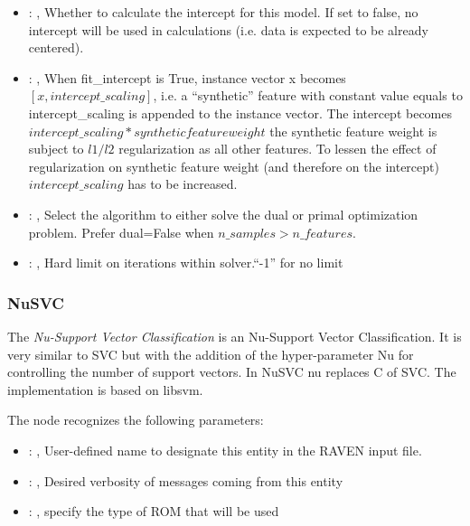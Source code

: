 \begin{itemize}
    \item {}: , 
      Whether to calculate the intercept for this model. If set to false, no
      intercept will be used in calculations (i.e. data is expected to be already centered).

    \item {}: , 
      When fit\_intercept is True, instance vector x becomes $[x, intercept\_scaling]$,
      i.e. a “synthetic” feature with constant value equals to intercept\_scaling is appended
      to the instance vector. The intercept becomes $intercept\_scaling * synthetic feature weight$
      \nb the synthetic feature weight is subject to $l1/l2$ regularization as all other features.
      To lessen the effect of regularization on synthetic feature weight (and therefore on the
      intercept)                                                  $intercept\_scaling$ has to be
      increased.

    \item {}: , 
      Select the algorithm to either solve the dual or primal optimization problem.
      Prefer dual=False when $n\_samples > n\_features$.

    \item {}: , 
      Hard limit on iterations within solver.``-1'' for no limit
  \end{itemize}


\subsubsection{NuSVC}
  The  \textit{Nu-Support Vector Classification} is an Nu-Support Vector
  Classification.                             It is very similar to SVC but with the addition of the
  hyper-parameter Nu for controlling the                             number of support vectors. In
  NuSVC nu replaces C of SVC.                             The implementation is based on libsvm.

  The  node recognizes the following parameters:
    \begin{itemize}
      \item {}: , 
        User-defined name to designate this entity in the RAVEN input file.
      \item {}: , 
        Desired verbosity of messages coming from this entity
      \item {}: , 
        specify the type of ROM that will be used
  \end{itemize}

